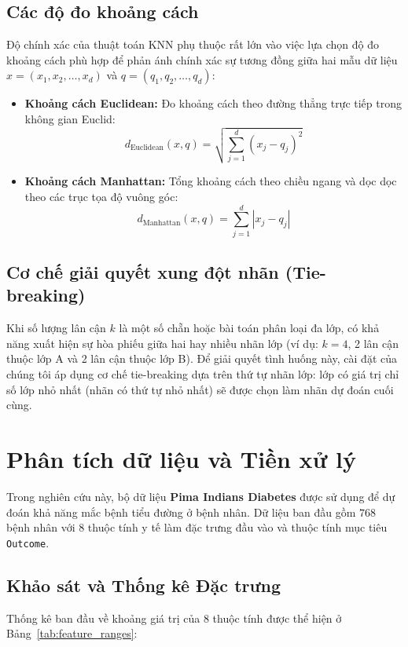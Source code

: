 \documentclass[a4paper,12pt]{report}
\begin{document}
\begin{itemize}
\subsection{Các độ đo khoảng cách}
Độ chính xác của thuật toán KNN phụ thuộc rất lớn vào việc lựa chọn độ đo khoảng cách phù hợp để phản ánh chính xác sự tương đồng giữa hai mẫu dữ liệu $x = (x_1, x_2, \dots, x_d)$ và $q = (q_1, q_2, \dots, q_d)$:
\begin{itemize}
    \item \textbf{Khoảng cách Euclidean:} Đo khoảng cách theo đường thẳng trực tiếp trong không gian Euclid:
    \begin{equation}
        d_{\text{Euclidean}}(x, q) = \sqrt{\sum_{j=1}^{d} (x_j - q_j)^2}
    \end{equation}
    \item \textbf{Khoảng cách Manhattan:} Tổng khoảng cách theo chiều ngang và dọc dọc theo các trục tọa độ vuông góc:
    \begin{equation}
        d_{\text{Manhattan}}(x, q) = \sum_{j=1}^{d} |x_j - q_j|
    \end{equation}
\end{itemize}

\subsection{Cơ chế giải quyết xung đột nhãn (Tie-breaking)}
Khi số lượng lân cận $k$ là một số chẵn hoặc bài toán phân loại đa lớp, có khả năng xuất hiện sự hòa phiếu giữa hai hay nhiều nhãn lớp (ví dụ: $k=4$, 2 lân cận thuộc lớp A và 2 lân cận thuộc lớp B). Để giải quyết tình huống này, cài đặt của chúng tôi áp dụng cơ chế tie-breaking dựa trên thứ tự nhãn lớp: lớp có giá trị chỉ số lớp nhỏ nhất (nhãn có thứ tự nhỏ nhất) sẽ được chọn làm nhãn dự đoán cuối cùng.

\section{Phân tích dữ liệu và Tiền xử lý}
Trong nghiên cứu này, bộ dữ liệu \textbf{Pima Indians Diabetes} được sử dụng để dự đoán khả năng mắc bệnh tiểu đường ở bệnh nhân. Dữ liệu ban đầu gồm $768$ bệnh nhân với $8$ thuộc tính y tế làm đặc trưng đầu vào và thuộc tính mục tiêu \texttt{Outcome}.

\subsection{Khảo sát và Thống kê Đặc trưng}
Thống kê ban đầu về khoảng giá trị của $8$ thuộc tính được thể hiện ở Bảng~\ref{tab:feature_ranges}:


\end{itemize}
\end{document}
